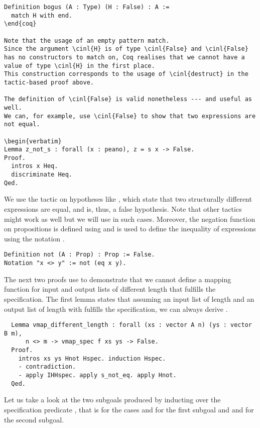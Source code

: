 \begin{verbatim}
Definition bogus (A : Type) (H : False) : A :=
  match H with end.
\end{coq}

Note that the usage of an empty pattern match.
Since the argument \cinl{H} is of type \cinl{False} and \cinl{False} has no constructors to match on, Coq realises that we cannot have a value of type \cinl{H} in the first place.
This construction corresponds to the usage of \cinl{destruct} in the tactic-based proof above.

The definition of \cinl{False} is valid nonetheless --- and useful as well.
We can, for example, use \cinl{False} to show that two expressions are not equal.

\begin{verbatim}
Lemma z_not_s : forall (x : peano), z = s x -> False.
Proof.
  intros x Heq.
  discriminate Heq.
Qed.
\end{verbatim}

We use the tactic  on hypotheses like , which state that two structurally different expressions are equal, and is, thus, a false hypothesis.
Note that other tactics might work as well but we will use  in such cases.
Moreover, the negation function  on propositions is defined using  and is used to define the inequality of expressions using the notation \cinl{<>}.

\begin{verbatim}
Definition not (A : Prop) : Prop := False.
Notation "x <> y" := not (eq x y).
\end{verbatim}

The next two proofs use  to demonstrate that we cannot define a mapping function for input and output lists of different length that fulfills the specification.
The first lemma states that assuming an input list  of length  and an output list  of length  with  fulfills the specification, we can always derive .

\begin{verbatim}
  Lemma vmap_different_length : forall (xs : vector A n) (ys : vector B m),
      n <> m -> vmap_spec f xs ys -> False.
  Proof.
    intros xs ys Hnot Hspec. induction Hspec.
    - contradiction.
    - apply IHHspec. apply s_not_eq. apply Hnot.
  Qed.
\end{verbatim}

Let us take a look at the two subgoals produced by inducting over the specification predicate , that is for the cases  and   for the first subgoal and  and  for the second subgoal.

